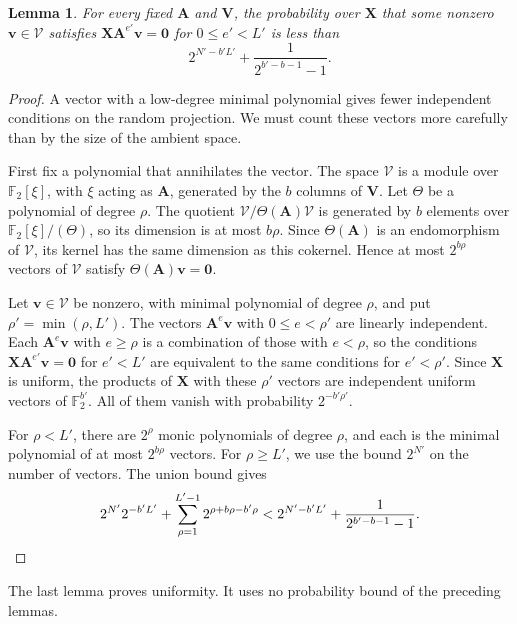 \documentclass[b5paper, 10pt, abstract=true, captions=tableheading]{scrartcl}
\theoremstyle{plain}
\newtheorem{lemma}{Lemma}
\theoremstyle{definition}
\newcommand{\FF}{\mathds{F}}
\renewcommand{\vec}[1]{\symbf{#1}}
\newcommand{\mat}[1]{\symbf{#1}}
\begin{document}
\begin{lemma}\label{lem:wiedemann-left}
For every fixed $\mat A$ and $\mat V$, the probability over $\mat X$ that
some nonzero $\vec v\in\mathcal V$ satisfies
$\mat X\mat A^{e'}\vec v=\vec 0$ for $0\leq e'<L'$ is less than
\[
  2^{N'-b'L'}+\frac1{2^{b'-b-1}-1}.
\]
\end{lemma}
\begin{proof}
A vector with a low-degree minimal polynomial gives fewer independent
conditions on the random projection. We must count these vectors more
carefully than by the size of the ambient space.

First fix a polynomial that annihilates the vector.
The space $\mathcal V$ is a module over $\FF_2[\xi]$, with $\xi$ acting as
$\mat A$, generated by the $b$ columns of $\mat V$. Let $\Theta$ be a
polynomial of degree $\rho$. The quotient
$\mathcal V/\Theta(\mat A)\mathcal V$ is generated by $b$ elements over
$\FF_2[\xi]/(\Theta)$, so its dimension is at most $b\rho$. Since
$\Theta(\mat A)$ is an endomorphism of $\mathcal V$, its kernel has the
same dimension as this cokernel. Hence at most $2^{b\rho}$ vectors of
$\mathcal V$ satisfy $\Theta(\mat A)\vec v=\vec 0$.

Let $\vec v\in\mathcal V$ be nonzero, with minimal polynomial of degree
$\rho$, and put $\rho'=\min(\rho,L')$. The vectors $\mat A^e\vec v$ with
$0\leq e<\rho'$ are linearly independent. Each $\mat A^e\vec v$ with
$e\geq\rho$ is a combination of those with $e<\rho$, so the conditions
$\mat X\mat A^{e'}\vec v=\vec 0$ for $e'<L'$ are equivalent to the same
conditions for $e'<\rho'$. Since $\mat X$ is uniform, the products of
$\mat X$ with these $\rho'$ vectors are independent uniform vectors of
$\FF_2^{b'}$. All of them vanish with probability $2^{-b'\rho'}$.

For $\rho<L'$, there are $2^\rho$ monic polynomials of degree $\rho$, and
each is the minimal polynomial of at most $2^{b\rho}$ vectors. For
$\rho\geq L'$, we use the bound $2^{N'}$ on the number of vectors. The
union bound gives
\[
  2^{N'}2^{-b'L'}+\sum_{\rho=1}^{L'-1}2^{\rho+b\rho-b'\rho}
  <2^{N'-b'L'}+\frac1{2^{b'-b-1}-1}.
  \qedhere
\]
\end{proof}

The last lemma proves uniformity. It uses no probability bound of the
preceding lemmas.
\end{document}
